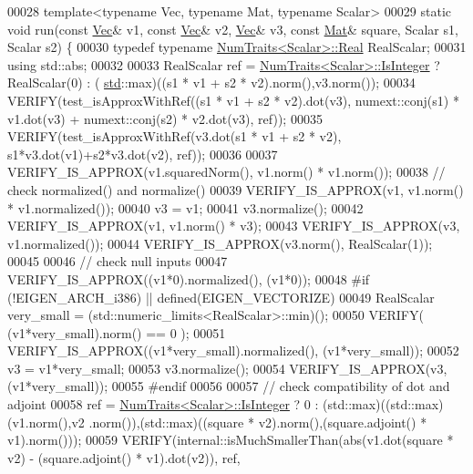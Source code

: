 \begin{DoxyCode}
00028   \textcolor{keyword}{template}<\textcolor{keyword}{typename} Vec, \textcolor{keyword}{typename} Mat, \textcolor{keyword}{typename} Scalar>
00029   \textcolor{keyword}{static} \textcolor{keywordtype}{void} run(\textcolor{keyword}{const} \hyperlink{group___core___module_class_eigen_1_1_matrix}{Vec}& v1, \textcolor{keyword}{const} \hyperlink{group___core___module_class_eigen_1_1_matrix}{Vec}& v2, \hyperlink{group___core___module_class_eigen_1_1_matrix}{Vec}& v3, \textcolor{keyword}{const} \hyperlink{group___core___module}{Mat}& square, Scalar s1, Scalar 
      s2) \{
00030     \textcolor{keyword}{typedef} \textcolor{keyword}{typename} \hyperlink{group___core___module_struct_eigen_1_1_num_traits}{NumTraits<Scalar>::Real} RealScalar;
00031     \textcolor{keyword}{using} std::abs;
00032     
00033     RealScalar ref = \hyperlink{group___core___module_struct_eigen_1_1_num_traits}{NumTraits<Scalar>::IsInteger} ? RealScalar(0) : (
      \hyperlink{namespacestd}{std}::max)((s1 * v1 + s2 * v2).norm(),v3.norm());
00034     VERIFY(test\_isApproxWithRef((s1 * v1 + s2 * v2).dot(v3),     numext::conj(s1) * v1.dot(v3) + 
      numext::conj(s2) * v2.dot(v3), ref));
00035     VERIFY(test\_isApproxWithRef(v3.dot(s1 * v1 + s2 * v2),       s1*v3.dot(v1)+s2*v3.dot(v2), ref));
00036   
00037     VERIFY\_IS\_APPROX(v1.squaredNorm(),                v1.norm() * v1.norm());
00038     \textcolor{comment}{// check normalized() and normalize()}
00039     VERIFY\_IS\_APPROX(v1, v1.norm() * v1.normalized());
00040     v3 = v1;
00041     v3.normalize();
00042     VERIFY\_IS\_APPROX(v1, v1.norm() * v3);
00043     VERIFY\_IS\_APPROX(v3, v1.normalized());
00044     VERIFY\_IS\_APPROX(v3.norm(), RealScalar(1));
00045 
00046     \textcolor{comment}{// check null inputs}
00047     VERIFY\_IS\_APPROX((v1*0).normalized(), (v1*0));
00048 \textcolor{preprocessor}{#if (!EIGEN\_ARCH\_i386) || defined(EIGEN\_VECTORIZE)}
00049     RealScalar very\_small = (std::numeric\_limits<RealScalar>::min)();
00050     VERIFY( (v1*very\_small).norm() == 0 );
00051     VERIFY\_IS\_APPROX((v1*very\_small).normalized(), (v1*very\_small));
00052     v3 = v1*very\_small;
00053     v3.normalize();
00054     VERIFY\_IS\_APPROX(v3, (v1*very\_small));
00055 \textcolor{preprocessor}{#endif}
00056     
00057     \textcolor{comment}{// check compatibility of dot and adjoint}
00058     ref = \hyperlink{group___core___module_struct_eigen_1_1_num_traits}{NumTraits<Scalar>::IsInteger} ? 0 : (std::max)((std::max)(v1.norm(),v2
      .norm()),(std::max)((square * v2).norm(),(square.adjoint() * v1).norm()));
00059     VERIFY(internal::isMuchSmallerThan(abs(v1.dot(square * v2) - (square.adjoint() * v1).dot(v2)), ref, 

\end{DoxyCode}

